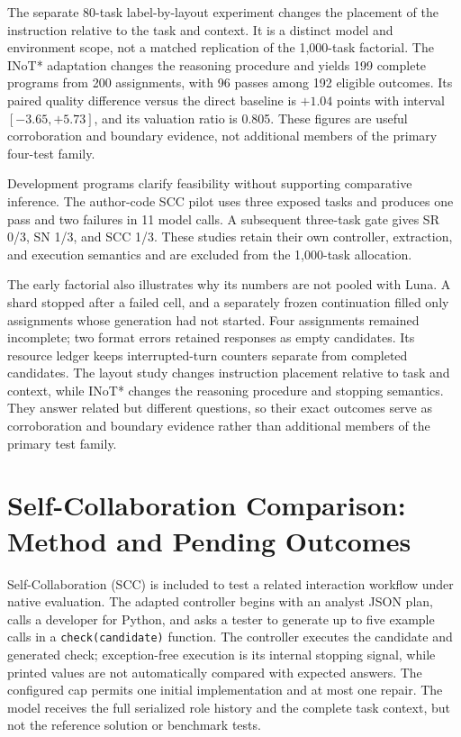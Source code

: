 The separate 80-task label-by-layout experiment changes the placement of the instruction relative to the task and context. It is a distinct model and environment scope, not a matched replication of the 1,000-task factorial. The INoT* adaptation changes the reasoning procedure and yields 199 complete programs from 200 assignments, with 96 passes among 192 eligible outcomes. Its paired quality difference versus the direct baseline is $+1.04$ points with interval $[-3.65,+5.73]$, and its valuation ratio is 0.805. These figures are useful corroboration and boundary evidence, not additional members of the primary four-test family.

Development programs clarify feasibility without supporting comparative inference. The author-code SCC pilot uses three exposed tasks and produces one pass and two failures in 11 model calls. A subsequent three-task gate gives SR 0/3, SN 1/3, and SCC 1/3. These studies retain their own controller, extraction, and execution semantics and are excluded from the 1,000-task allocation.

The early factorial also illustrates why its numbers are not pooled with Luna. A shard stopped after a failed cell, and a separately frozen continuation filled only assignments whose generation had not started. Four assignments remained incomplete; two format errors retained responses as empty candidates. Its resource ledger keeps interrupted-turn counters separate from completed candidates. The layout study changes instruction placement relative to task and context, while INoT* changes the reasoning procedure and stopping semantics. They answer related but different questions, so their exact outcomes serve as corroboration and boundary evidence rather than additional members of the primary test family.

\section{Self-Collaboration Comparison: Method and Pending Outcomes}
Self-Collaboration (SCC) is included to test a related interaction workflow under native evaluation. The adapted controller begins with an analyst JSON plan, calls a developer for Python, and asks a tester to generate up to five example calls in a \texttt{check(candidate)} function. The controller executes the candidate and generated check; exception-free execution is its internal stopping signal, while printed values are not automatically compared with expected answers. The configured cap permits one initial implementation and at most one repair. The model receives the full serialized role history and the complete task context, but not the reference solution or benchmark tests.

